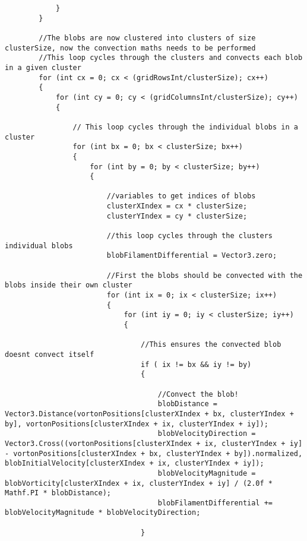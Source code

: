 \begin{mdframed}[linecolor=black, topline=true, bottomline=true,
  leftline=false, rightline=false]
\begin{verbatim}
            }
        }

        //The blobs are now clustered into clusters of size clusterSize, now the convection maths needs to be performed
        //This loop cycles through the clusters and convects each blob in a given cluster
        for (int cx = 0; cx < (gridRowsInt/clusterSize); cx++)
        {
            for (int cy = 0; cy < (gridColumnsInt/clusterSize); cy++)
            {
                
                // This loop cycles through the individual blobs in a cluster
                for (int bx = 0; bx < clusterSize; bx++)
                {
                    for (int by = 0; by < clusterSize; by++)
                    {

                        //variables to get indices of blobs
                        clusterXIndex = cx * clusterSize;
                        clusterYIndex = cy * clusterSize;

                        //this loop cycles through the clusters individual blobs
                        blobFilamentDifferential = Vector3.zero;

                        //First the blobs should be convected with the blobs inside their own cluster
                        for (int ix = 0; ix < clusterSize; ix++)
                        {
                            for (int iy = 0; iy < clusterSize; iy++)
                            {
                                
                                //This ensures the convected blob doesnt convect itself
                                if ( ix != bx && iy != by)
                                {

                                    //Convect the blob!
                                    blobDistance = Vector3.Distance(vortonPositions[clusterXIndex + bx, clusterYIndex + by], vortonPositions[clusterXIndex + ix, clusterYIndex + iy]);
                                    blobVelocityDirection = Vector3.Cross((vortonPositions[clusterXIndex + ix, clusterYIndex + iy] - vortonPositions[clusterXIndex + bx, clusterYIndex + by]).normalized, blobInitialVelocity[clusterXIndex + ix, clusterYIndex + iy]);
                                    blobVelocityMagnitude = blobVorticity[clusterXIndex + ix, clusterYIndex + iy] / (2.0f * Mathf.PI * blobDistance);
                                    blobFilamentDifferential += blobVelocityMagnitude * blobVelocityDirection;

                                }


\end{verbatim}
\end{mdframed}
